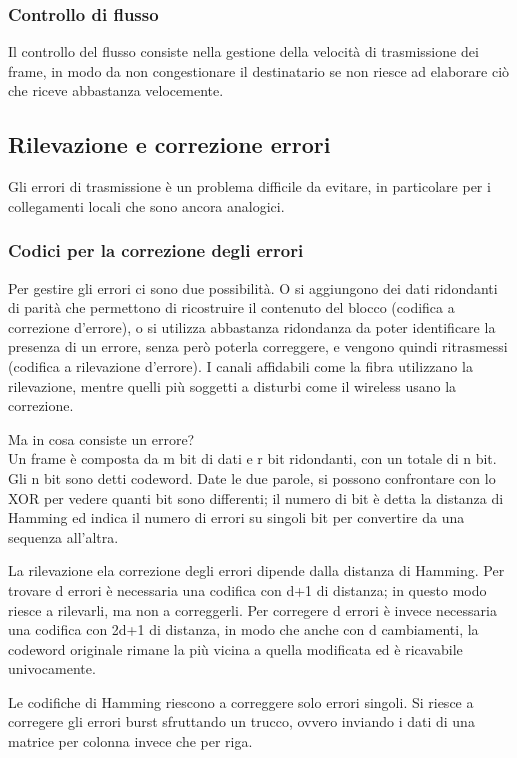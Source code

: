 \subsubsection{Controllo di flusso}
Il controllo del flusso consiste nella gestione della velocità di trasmissione dei frame,
in modo da non congestionare il destinatario se non riesce ad elaborare ciò che riceve abbastanza velocemente.

\subsection{Rilevazione e correzione errori} %
Gli errori di trasmissione è un problema difficile da evitare, in particolare per i collegamenti locali che sono ancora analogici.

\subsubsection{Codici per la correzione degli errori}
Per gestire gli errori ci sono due possibilità. 
O si aggiungono dei dati ridondanti di parità che permettono di ricostruire il contenuto del blocco (codifica a correzione d'errore),
o si utilizza abbastanza ridondanza da poter identificare la presenza di un errore, senza però poterla correggere, e vengono quindi ritrasmessi (codifica a rilevazione d'errore).
I canali affidabili come la fibra utilizzano la rilevazione, mentre quelli più soggetti a disturbi come il wireless usano la correzione.

Ma in cosa consiste un errore? \\
Un frame è composta da m bit di dati e r bit ridondanti, con un totale di n bit.
Gli n bit sono detti codeword. 
Date le due parole, si possono confrontare con lo XOR per vedere quanti bit sono differenti;
il numero di bit è detta la distanza di Hamming ed indica il numero di errori su singoli bit per convertire da una sequenza all'altra.

La rilevazione ela correzione degli errori dipende dalla distanza di Hamming.
Per trovare d errori è necessaria una codifica con d+1 di distanza;
in questo modo riesce a rilevarli, ma non a correggerli.
Per corregere d errori è invece necessaria una codifica con 2d+1 di distanza,
in modo che anche con d cambiamenti, la codeword originale rimane la più vicina a quella modificata ed è ricavabile univocamente.

Le codifiche di Hamming riescono a correggere solo errori singoli.
Si riesce a corregere gli errori burst sfruttando un trucco, ovvero inviando i dati di una matrice per colonna invece che per riga.

